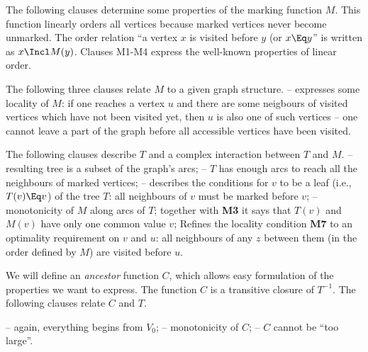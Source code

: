 \documentclass[leqno]{article}
\begin{document}
The following clauses determine some properties of the marking function $M$. This
function linearly orders all vertices because marked vertices never become
unmarked. The order relation ``a vertex $x$ is visited before $y$ 
(or \(x\Eq y\)'' is
written as \(x\Incl M(y)\). Clauses M1-M4 express the well-known properties
of linear order.

The following three clauses relate $M$ to a given graph structure.
   -- expresses some locality of $M$: if one reaches a vertex $u$ and
there are some neigbours of visited vertices which have not
been visited yet, then $u$ is also
one of such vertices -- one cannot leave a part of the graph before
all accessible vertices have been visited.

The following clauses describe $T$ and a complex interaction between $T$ and
$M$.   
  -- resulting tree is a subset of the graph's arcs;
  -- $T$ has enough arcs to reach all the neighbours of marked vertices;
  -- describes the conditions for $v$ to be a leaf (i.e., \(T(v)\Eq v\)) of the
  tree $T$: all neighbours of $v$ must be marked before $v$;
  -- monotonicity of $M$ along arcs of $T$; together with {\bf M3} %
it says that $T(v)$ and $M(v)$ have only one common value
  $v$;
 Refines the locality condition {\bf M7} %
to an optimality requirement on $v$ and $u$:
all neighbours of any $z$ between them (in the
order defined by $M$) are visited before $u$.  

We will define an {\em ancestor} function $C$, which allows easy
formulation of the properties we want to express. The function $C$ is a
transitive closure of \(T^{-1}\). The following clauses relate $C$ and $T$.

   -- again, everything begins from $V_0$;
   -- monotonicity of $C$;
   -- $C$ cannot be ``too large''.
\end{document}
